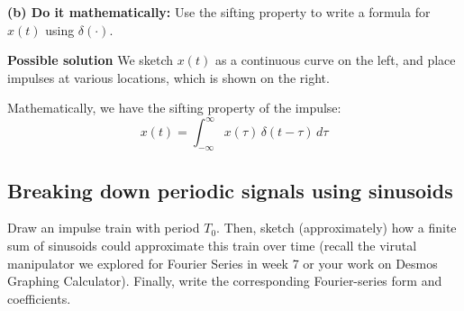 \medskip
\textbf{(b) Do it mathematically:} Use the sifting property to write a formula for $x(t)$ using $\delta(\cdot)$.


\textbf{Possible solution}
We sketch $x(t)$ as a continuous curve on the left, and place impulses at various locations, which is shown on the right. 
\begin{center}
\begin{minipage}{0.47\linewidth}
\end{minipage}\hfill
\begin{minipage}{0.47\linewidth}
\end{minipage}
\end{center}

Mathematically, we have the sifting property of the impulse:
\[\,x(t)=\int_{-\infty}^{\infty} x(\tau)\,\delta(t-\tau)\,d\tau\,
\] 

\subsection{Breaking down periodic signals using sinusoids}
Draw an impulse train with period $T_0$. Then, sketch (approximately) how a finite sum of sinusoids could approximate this train over time (recall the virutal manipulator we explored for Fourier Series in week 7 or your work on Desmos Graphing Calculator). Finally, write the corresponding Fourier-series form and coefficients.

